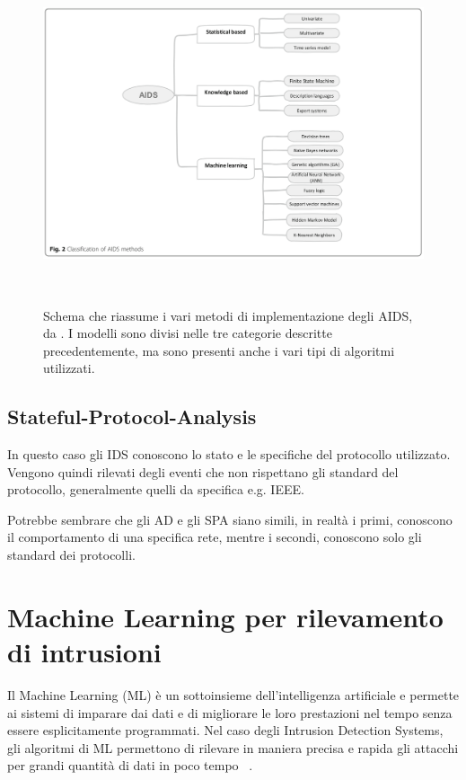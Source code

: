 \begin{figure}[htpb]
    \centering
    \includegraphics[width=\textwidth,height=10cm,keepaspectratio=true]{img/aids_classification.png}
    \caption{
        Schema che riassume i vari metodi di implementazione degli AIDS, da \cite{SurveyIntrusionDetection2019}. I modelli sono divisi nelle tre categorie descritte precedentemente, ma sono presenti anche i vari tipi di algoritmi utilizzati.
    }
    \label{fig:aids_classification}
\end{figure}


\subsection{Stateful-Protocol-Analysis}

In questo caso gli IDS conoscono lo stato e le specifiche del protocollo utilizzato. Vengono quindi rilevati degli eventi che non rispettano gli standard del protocollo, generalmente quelli da specifica e.g. IEEE.

Potrebbe sembrare che gli AD e gli SPA siano simili, in realtà i primi, conoscono il comportamento di una specifica rete,  mentre i secondi, conoscono solo gli standard dei protocolli.



\section{Machine Learning per rilevamento di intrusioni}


Il Machine Learning (ML) è un sottoinsieme dell'intelligenza artificiale e permette ai sistemi di imparare dai dati e di migliorare le loro prestazioni nel tempo senza essere esplicitamente programmati. Nel caso degli Intrusion Detection Systems, gli algoritmi di ML permettono di rilevare in maniera precisa e rapida gli attacchi per grandi quantità di dati in poco tempo ~\cite{saranyaPerformanceAnalysisMachine2020}.


